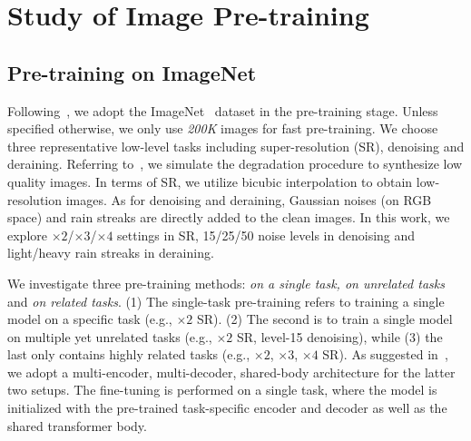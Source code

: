 \documentclass[runningheads]{llncs}
\makeatletter
\newcommand*{\eg}{e.g.\@\xspace}
\makeatother
\begin{document}
\section{Study of Image Pre-training}
	\label{sec:pre}
	
	\subsection{Pre-training on ImageNet}
	\label{sec:imagenet}
	
	Following~\cite{chen2021pre}, we adopt the ImageNet~\cite{deng2009imagenet} dataset in the pre-training stage. Unless specified otherwise, we only use \textit{200K} images for fast pre-training. We choose three representative low-level tasks including super-resolution (SR), denoising and deraining. Referring to~\cite{chen2021pre,agustsson2017ntire,gu2017joint}, we simulate the degradation procedure to synthesize low quality images. In terms of SR, we utilize bicubic interpolation to obtain low-resolution images. As for denoising and deraining, Gaussian noises (on RGB space) and rain streaks are directly added to the clean images. In this work, we explore $\times 2$/$\times 3$/$\times 4$ settings in SR, 15/25/50 noise levels in denoising and light/heavy rain streaks in deraining.
	
	We investigate three pre-training methods:  \textit{on a single task, on unrelated tasks} and \textit{on related tasks}. (1) The single-task pre-training refers to training a single model on a specific task (\eg, $\times 2$ SR). (2) The second is to train a single model on multiple yet unrelated tasks  (\eg, $\times 2$ SR,  level-15 denoising), while (3) the last only contains highly related tasks (\eg, $\times 2$, $\times 3$, $\times 4$ SR). As suggested in~\cite{chen2021pre}, we adopt a multi-encoder, multi-decoder, shared-body architecture for the latter two setups. The fine-tuning is performed on a single task, where the model is initialized with the pre-trained task-specific encoder and decoder as well as the shared transformer body. 
\end{document}
